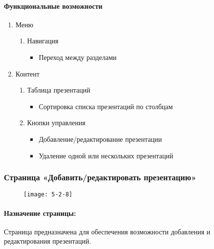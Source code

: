 \paragraph{Функциональные возможности}
\begin{enumerate}
	\item Меню
	\begin{enumerate}
		\item Навигация
		\begin{itemize}
			\item Переход между разделами
		\end{itemize}
	\end{enumerate}

	\item Контент
	\begin{enumerate}
		\item Таблица презентаций
		\begin{itemize}
			\item Сортировка списка презентаций по столбцам
		\end{itemize}

		\item Кнопки управления
		\begin{itemize}
			\item Добавление/редактирование презентации
			\item Удаление одной или нескольких презентаций
		\end{itemize}
	\end{enumerate}
\end{enumerate}


\subsubsection{Страница «Добавить/редактировать презентацию»}
\begin{figure}[H]
	\texttt{[image: 5-2-8]}
\end{figure}
\paragraph{Назначение страницы:} Страница предназначена для обеспечения возможности добавления и редактирования презентаций.

